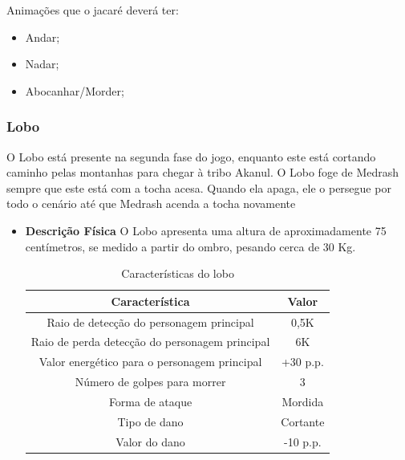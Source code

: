 \begin{itemize}
Animações que o jacaré deverá ter:
\begin{itemize}
\item Andar;
\item Nadar;
\item Abocanhar/Morder;
\end{itemize}
\end{itemize}
\subsubsection{Lobo}
O Lobo está presente na segunda fase do jogo, enquanto este está cortando caminho pelas montanhas para chegar à tribo Akanul. O Lobo foge de Medrash sempre que este está com a tocha acesa. Quando ela apaga, ele o persegue por todo o cenário até que Medrash acenda a tocha novamente
\begin{itemize}
\item {\bf Descrição Física}
O Lobo apresenta uma altura de aproximadamente 75 centímetros, se medido a partir do ombro, pesando cerca de 30 Kg.
\begin{table}[H]
\begin{center}
\begin{tabular}{|c|c|}
\hline 
\textbf{Característica} & \textbf{Valor} \\ 
\hline 
Raio de detecção do personagem principal & 0,5K \\ 
\hline 
Raio de perda detecção do personagem principal & 6K \\ 
\hline 
Valor energético para o personagem principal & +30 p.p. \\ 
\hline 
Número de golpes para morrer & 3 \\ 
\hline 
Forma de ataque & Mordida \\ 
\hline 
Tipo de dano & Cortante \\ 
\hline 
Valor do dano & -10 p.p. \\ 
\hline 
\end{tabular} 
\end{center}
\caption{Características do lobo}
\label{table:lobo}
\end{table}
\end{itemize}
